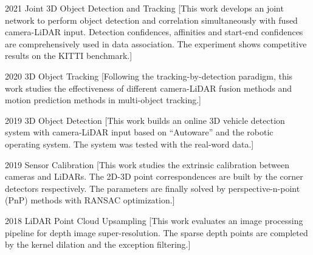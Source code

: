 \documentclass{resume}
\begin{document}
\begin{experiences}
  \experience%
	{2021}%
    {Joint 3D Object Detection and Tracking}%
    [This work develops an joint network to perform object detection and correlation simultaneously with fused camera-LiDAR input. Detection confidences, affinities and start-end confidences are comprehensively used in data association. The experiment shows competitive results on the KITTI benchmark.]  
  
\separator{0.5ex}

  \experience%
    {2020}%
    {3D Object Tracking}%
    [Following the tracking-by-detection paradigm, this work studies the effectiveness of different camera-LiDAR fusion methods and motion prediction methods in multi-object tracking.]

\separator{0.5ex}

  \experience%
    {2019}%
    {3D Object Detection}%
    [This work builds an online 3D vehicle detection system with camera-LiDAR input based on ``Autoware'' and the robotic operating system. The system was tested with the real-word data.] 

\separator{0.5ex}

  \experience%
    {2019}%
    {Sensor Calibration}%
    [This work studies the extrinsic calibration between cameras and LiDARs. The 2D-3D point correspondences are built by the corner detectors respectively. The parameters are finally solved by perspective-n-point (PnP) methods with RANSAC optimization.]

\separator{0.5ex}

  \experience%
    {2018}%
    {LiDAR Point Cloud Upsampling}%
    [This work evaluates an image processing pipeline for depth image super-resolution. The sparse depth points are completed by the kernel dilation and the exception filtering.]   
    

\end{experiences}

\begin{competences}[12em]
\end{competences}
\end{document}
